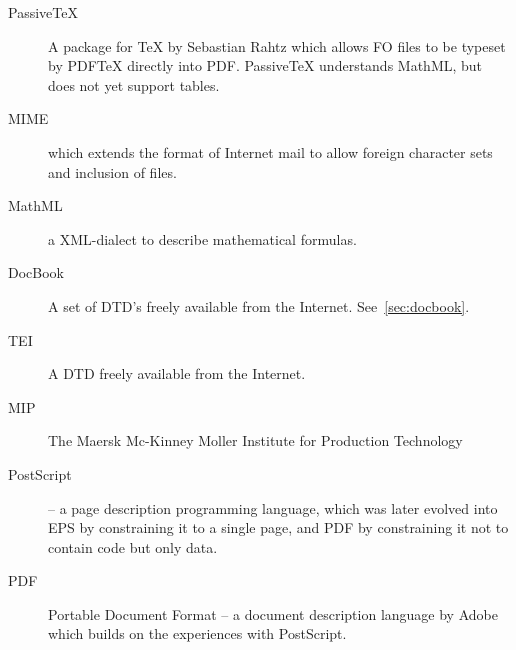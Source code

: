 \begin{description}
\item[PassiveTeX] A package for {\TeX} by Sebastian Rahtz which allows
  FO files to be typeset by PDF{\TeX} directly into PDF.  PassiveTeX
  understands MathML, but does not yet support tables.
  
\item[MIME]
   which extends the format of Internet
  mail to allow foreign character sets and inclusion of files.  
  

\item[MathML] a XML-dialect to describe mathematical formulas.


\item[DocBook] A set of DTD's freely available from the Internet.
  See~\vref{sec:docbook}.
\item[TEI] A DTD freely available from the Internet.  
\item[MIP] The Maersk Mc-Kinney Moller Institute for Production Technology

\item[PostScript] -- a page description programming language, which
  was later evolved into EPS by constraining it to a single page, and
  PDF by constraining it not to contain code but only data.
  
\item[PDF] Portable Document Format -- a document description
  language by Adobe which builds on the experiences with PostScript.
\end{description}

  
    
